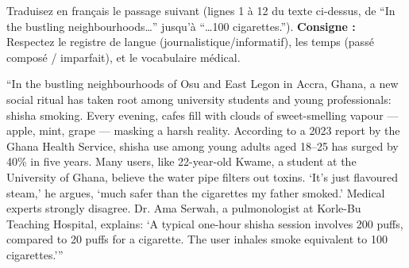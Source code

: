 \documentclass[11pt]{article}
\begin{document}
\begin{exercice}
Traduisez en français le passage suivant (lignes 1 à 12 du texte ci-dessus, de “In the bustling neighbourhoods…” jusqu'à “…100 cigarettes.”).
\textbf{Consigne :} Respectez le registre de langue (journalistique/informatif), les temps (passé composé / imparfait), et le vocabulaire médical.
\begin{textebox}
“In the bustling neighbourhoods of Osu and East Legon in Accra, Ghana, a new social ritual has taken root among university students and young professionals: shisha smoking. Every evening, cafes fill with clouds of sweet-smelling vapour — apple, mint, grape — masking a harsh reality. According to a 2023 report by the Ghana Health Service, shisha use among young adults aged 18--25 has surged by 40\% in five years. Many users, like 22-year-old Kwame, a student at the University of Ghana, believe the water pipe filters out toxins. ‘It’s just flavoured steam,’ he argues, ‘much safer than the cigarettes my father smoked.’ Medical experts strongly disagree. Dr. Ama Serwah, a pulmonologist at Korle-Bu Teaching Hospital, explains: ‘A typical one-hour shisha session involves 200 puffs, compared to 20 puffs for a cigarette. The user inhales smoke equivalent to 100 cigarettes.’”
\end{textebox}
\end{exercice}
\end{document}
